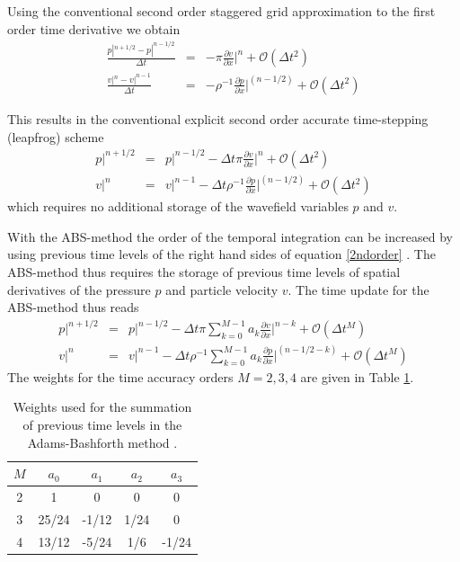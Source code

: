 \documentclass[11pt,onecolumn,oneside]{article}
\begin{document}
Using the conventional second order staggered grid approximation to the first order time derivative we obtain
\begin{eqnarray}
\frac{p |^{n+1/2}-p|^{n-1/2}}{\Delta t}&=& - \pi \frac{\partial v}{\partial x}\bigg |^n  + \mathcal{O}(\Delta t^2) \nonumber \\ 
\frac{v|^n-v|^{n-1}}{\Delta t}&=& -\rho^{-1} \frac{\partial p}{\partial x}\bigg |^{(n-1/2)} + \mathcal{O}(\Delta t^2)
\label{2ndorder}
\end{eqnarray}

This results in the conventional explicit second order accurate time-stepping (leapfrog) scheme
\begin{eqnarray}
p|^{n+1/2}&=&p|^{n-1/2} - \Delta t \pi \frac{\partial v}{\partial x}\bigg |^n  + \mathcal{O}(\Delta t^2) \nonumber \\
v|^n&=&v|^{n-1} -\Delta t \rho^{-1} \frac{\partial p}{\partial x}\bigg |^{(n-1/2)}  + \mathcal{O}(\Delta t^2)
\label{2ndorderexplicit}
\end{eqnarray}
which requires no additional storage of the wavefield variables $p$ and $v$. 

With the ABS-method the order of the temporal integration  can be increased by using previous time levels of the right hand sides of equation \ref{2ndorder} \cite{ghrist2000staggered}.
The ABS-method thus requires the storage of previous time levels of spatial derivatives of the pressure $p$ and particle velocity $v$. The time update for the ABS-method thus reads
\begin{eqnarray}
p|^{n+1/2}&=&p|^{n-1/2} - \Delta t \pi \sum_{k=0}^{M-1} a_k \frac{\partial v}{\partial x}\bigg |^{n-k}   + \mathcal{O}(\Delta t^M) \nonumber \\
v|^n&=&v|^{n-1} -\Delta t \rho^{-1}  \sum_{k=0}^{M-1} a_k  \frac{\partial p}{\partial x}\bigg |^{(n-1/2-k)}  + \mathcal{O}(\Delta t^M)
\label{absmethod}
\end{eqnarray}
The weights for the time accuracy orders $M=2,3,4$ are given in Table \ref{absweights}. 

\begin{table}[ht]
\begin{center}
\begin{tabular}{|c|c|c|c|c|}\hline
$M$ & $a_0$ & $a_1$ & $a_2$ & $a_3$  \\ \hline
2 & 1             &  0           &  0           &     0   \\
3 &  25/24     &  -1/12         & 1/24   & 0   \\
4 & 13/12      &  -5/24      &  1/6       &  -1/24     \\ \hline
\end{tabular}
\end{center}
\caption{\label{absweights}Weights used for the summation of previous time levels in the Adams-Bashforth method \protect\cite{ghrist2000staggered}.}
\end{table}
\newpage
\end{document}
